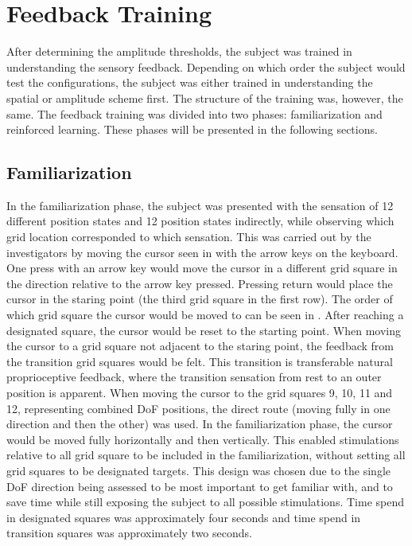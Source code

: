 
\section{Feedback Training}
After determining the amplitude thresholds, the subject was trained in understanding the sensory feedback. Depending on which order the subject would test the configurations, the subject was either trained in understanding the spatial or amplitude scheme first. The structure of the training was, however, the same. The feedback training was divided into two phases: familiarization and reinforced learning. These phases will be presented in the following sections.

\subsection{Familiarization} \label{sec:meth:FBtrainingFam}
In the familiarization phase, the subject was presented with the sensation of 12 different position states and 12 position states indirectly, while observing which grid location corresponded to which sensation. This was carried out by the investigators by moving the cursor seen in  with the arrow keys on the keyboard. One press with an arrow key would move the cursor in a different grid square in the direction relative to the arrow key pressed. Pressing return would place the cursor in the staring point (the third grid square in the first row). The order of which grid square the cursor would be moved to can be seen in . After reaching a designated square, the cursor would be reset to the starting point. When moving the cursor to a grid square not adjacent to the staring point, the feedback from the transition grid squares would be felt. This transition is transferable natural proprioceptive feedback, where the transition sensation from rest to an outer position is apparent. When moving the cursor to the grid squares 9, 10, 11 and 12, representing combined DoF positions, the direct route (moving fully in one direction and then the other) was used. In the familiarization phase, the cursor would be moved fully horizontally and then vertically. This enabled stimulations relative to all grid square to be included in the familiarization, without setting all grid squares to be designated targets. This design was chosen due to the single DoF direction being assessed to be most important to get familiar with, and to save time while still exposing the subject to all possible stimulations. Time spend in designated squares was approximately four seconds and time spend in transition squares was approximately two seconds.

